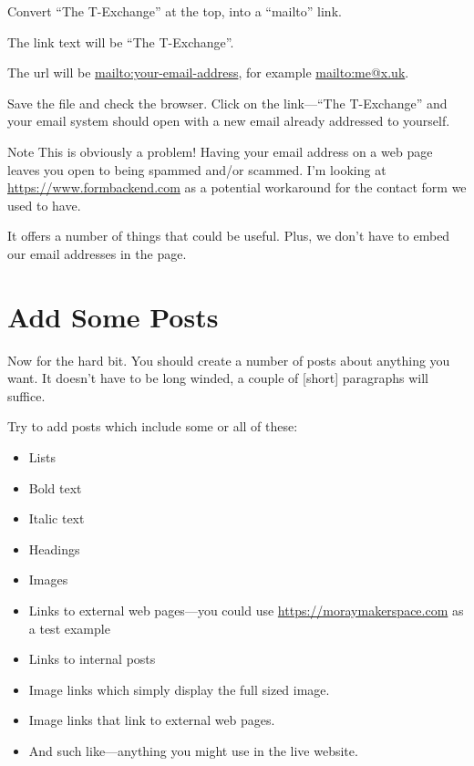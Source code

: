 \hspace{\parindent}Convert ``The T-Exchange'' at the top, into a ``mailto'' link.

\hspace{\parindent}\hspace{\parindent}The link text will be ``The T-Exchange''.

\hspace{\parindent}\hspace{\parindent}The url will be \url{mailto:your-email-address}, for example \url{mailto:me@x.uk}.

Save the file and check the browser. Click on the link---``The T-Exchange'' and your email system should open with a new email already addressed to yourself.

\begin{tips}{Note}
    This is obviously a problem! Having your email address on a web page leaves you open to being spammed and/or scammed. I'm looking at \url{https://www.formbackend.com} as a potential workaround for the contact form we used to have.

    It offers a number of things that could be useful. Plus, we don't have to embed our email addresses in the page.
\end{tips}

\section{Add Some Posts}

Now for the hard bit. You should create a number of posts about anything  you want. It doesn't have to be long winded, a couple of [short] paragraphs will suffice.

Try to add posts which include some or all of these:

\begin{itemize}
    \item Lists
    \item Bold text
    \item Italic text
    \item Headings
    \item Images
    \item Links to external web pages---you could use \url{https://moraymakerspace.com} as a test example
    \item Links to internal posts
    \item Image links which simply display the full sized image.
    \item Image links that link to external web pages.
    \item And such like---anything you might use in the live website.
\end{itemize}

